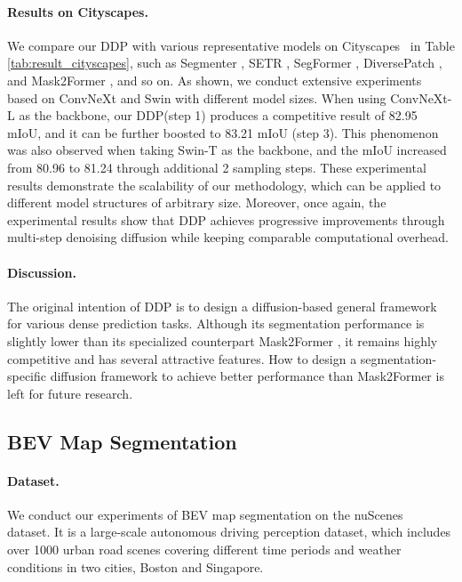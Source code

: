 \documentclass[10pt,twocolumn,letterpaper]{article}
\newcommand{\ours}[0]{DDP\xspace}
\begin{document}
\paragraph{Results on Cityscapes.}
We compare our \ours with various representative models on Cityscapes~\cite{Cordts_2016_CVPR} in Table \ref{tab:result_cityscapes}, such as Segmenter \cite{strudel2021segmenter}, SETR \cite{zheng2021rethinking}, SegFormer \cite{xie2021segformer}, DiversePatch \cite{gong2021vision}, and Mask2Former \cite{cheng2022masked}, and so on.
As shown, we conduct extensive experiments based on ConvNeXt \cite{liu2022convnet} and Swin \cite{liu2021swin} with different model sizes. 
When using ConvNeXt-L as the backbone, our \ours (step 1) produces a competitive result of 82.95 mIoU, and it can be further boosted to 83.21 mIoU (step 3). 
This phenomenon was also observed when taking Swin-T as the backbone, and the mIoU increased from 80.96 to 81.24 through additional 2 sampling steps.
These experimental results demonstrate the scalability of our methodology, which can be applied to different model structures of arbitrary size.
Moreover, once again, the experimental results show that \ours achieves progressive improvements through multi-step denoising diffusion while keeping comparable computational overhead.

\paragraph{Discussion.}  
The original intention of DDP is to design a diffusion-based general framework for various dense prediction tasks. 
Although its segmentation performance is slightly lower than its specialized counterpart Mask2Former \cite{cheng2022masked}, 
it remains highly competitive and has several attractive features.
How to design a segmentation-specific diffusion framework to achieve better performance than Mask2Former is left for future research.


\subsection{BEV Map Segmentation}

\paragraph{Dataset.} 
We conduct our experiments of BEV map segmentation on the nuScenes~\cite{caesar2020nuscenes} dataset. 
It is a large-scale autonomous driving perception dataset, which includes over 1000 urban road scenes covering different time periods and weather conditions in two cities, Boston and Singapore.
\end{document}
